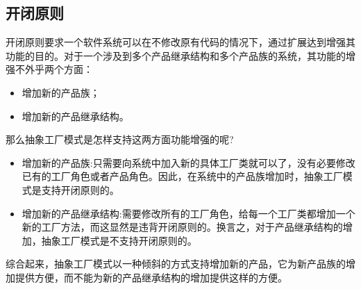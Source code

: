 \documentclass[../main.tex]{subfiles}
\begin{document}
\subsection{开闭原则}
开闭原则要求一个软件系统可以在不修改原有代码的情况下，通过扩展达到增强其功能的目的。对于一个涉及到多个产品继承结构和多个产品族的系统，其功能的增强不外乎两个方面：
\begin{itemize}
  \item 增加新的产品族；
  \item 增加新的产品继承结构。
\end{itemize}
那么抽象工厂模式是怎样支持这两方面功能增强的呢?
\begin{itemize}
  \item 增加新的产品族:只需要向系统中加入新的具体工厂类就可以了，没有必要修改已有的工厂角色或者产品角色。因此，在系统中的产品族增加时，抽象工厂模式是支持开闭原则的。
  \item 增加新的产品继承结构:需要修改所有的工厂角色，给每一个工厂类都增加一个新的工厂方法，而这显然是违背开闭原则的。换言之，对于产品继承结构的增加，抽象工厂模式是不支持开闭原则的。
\end{itemize}
综合起来，抽象工厂模式以一种倾斜的方式支持增加新的产品，它为新产品族的增加提供方便，而不能为新的产品继承结构的增加提供这样的方便。
\end{document}
